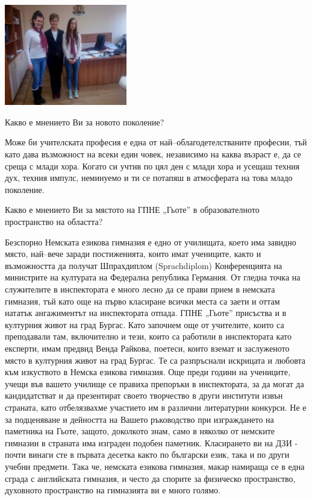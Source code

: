 \begin{multicols}{3}

\includegraphics[width=2.1in]{./Ilieva/Ilieva.jpg}

Какво е мнението Ви за новото поколение?

Може би учителската професия е една от най–облагодетелстваните професии, тъй 
като дава възможност на всеки един човек, независимо на каква възраст е, да се 
среща с млади хора. Когато си учтив по цял ден с млади хора и усещаш техния дух, 
техния импулс, неминуемо и ти се потапяш в атмосферата на това младо поколение.

Какво е мнението Ви за мястото на ГПНЕ „Гьоте” в образователното пространство 
на областта?

Безспорно Немската езикова гимназия е едно от училищата, което има завидно 
място, най–вече заради постиженията, които имат учениците, както и възможността 
да получат Шпрахдиплом (Sprachdiplom) Конференцията на министрите на културата 
на Федерална република Германия. От гледна точка на служителите в инспектората е 
много лесно да се прави прием в немската гимназия, тъй като още на първо 
класиране всички места са заети и оттам нататък ангажиментът на инспектората 
отпада. ГПНЕ „Гьоте” присъства и в културния живот на град Бургас. Като започнем 
още от учителите, които са преподавали там, включително и тези, които са 
работили в инспектората като експерти, имам предвид Венда Райкова, поетеси, 
които вземат и заслуженото място в културния живот на град Бургас. Те са 
разпръснали искрицата и любовта към изкуството в Немска езикова гимназия. Още 
преди години на учениците, учещи във вашето училище се правиха препоръки в 
инспектората, за да могат да кандидатстват и да презентират своето творчество в 
други институти извън страната, като отбелязвахме участието им в различни 
литературни конкурси. Не е за подценяване и дейността на Вашето ръководство при 
изграждането на паметника на Гьоте, защото, доколкото знам, само в няколко от 
немските гимназии в страната има изграден подобен паметник. Класирането ви на 
ДЗИ - почти винаги сте в първата десетка както по български език, така и по 
други учебни предмети. Така че, немската езикова гимназия, макар намираща се в 
една сграда с английската гимназия, и често да спорите за физическо 
пространство, духовното пространство на гимназията ви е много голямо.


\end{multicols}
